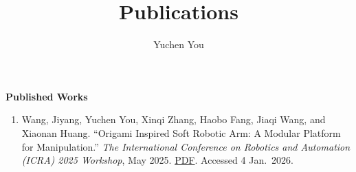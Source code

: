 \documentclass[11pt]{article}
\title{Publications}
\author{Yuchen You}
\date{}
\begin{document}
\maketitle

\noindent\textbf{Published Works}

\begin{enumerate}[leftmargin=*, itemsep=0.4em]

\item Wang, Jiyang, Yuchen You, Xinqi Zhang, Haobo Fang, Jiaqi Wang, and Xiaonan Huang.
``Origami Inspired Soft Robotic Arm: A Modular Platform for Manipulation.''
\textit{The International Conference on Robotics and Automation (ICRA) 2025 Workshop}, May 2025.
\href{https://softroboticsforspace.eu/images/paper-submissions/Fang-ICRA2025-Soft-Robotics-for-Space-Applications.pdf}{PDF}.
Accessed 4 Jan.\ 2026.

\end{enumerate}
\end{document}
